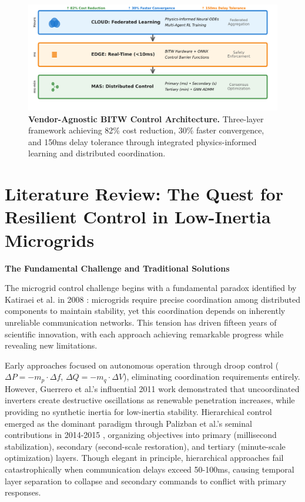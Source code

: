 \documentclass[12pt]{article}
\begin{document}
\begin{figure}[H]
\centering
\includegraphics[width=\textwidth]{figure3_system_architecture.pdf}
\vspace{-2cm}
\caption{\textbf{Vendor-Agnostic BITW Control Architecture.} Three-layer framework achieving 82\% cost reduction, 30\% faster convergence, and 150ms delay tolerance through integrated physics-informed learning and distributed coordination.}
\label{fig:architecture}
\end{figure}

\section{Literature Review: The Quest for Resilient Control in Low-Inertia Microgrids}

\textbf{The Fundamental Challenge and Traditional Solutions}

The microgrid control challenge begins with a fundamental paradox identified by Katiraei et al. in 2008 \cite{katiraei2008}: microgrids require precise coordination among distributed components to maintain stability, yet this coordination depends on inherently unreliable communication networks. This tension has driven fifteen years of scientific innovation, with each approach achieving remarkable progress while revealing new limitations.

Early approaches focused on autonomous operation through droop control ($\Delta P = -m_p \cdot \Delta f$, $\Delta Q = -m_q \cdot \Delta V$), eliminating coordination requirements entirely. However, Guerrero et al.'s influential 2011 work \cite{guerrero2011} demonstrated that uncoordinated inverters create destructive oscillations as renewable penetration increases, while providing no synthetic inertia for low-inertia stability. Hierarchical control emerged as the dominant paradigm through Palizban et al.'s seminal contributions in 2014-2015 \cite{palizban2014,palizban2015}, organizing objectives into primary (millisecond stabilization), secondary (second-scale restoration), and tertiary (minute-scale optimization) layers. Though elegant in principle, hierarchical approaches fail catastrophically when communication delays exceed 50-100ms, causing temporal layer separation to collapse and secondary commands to conflict with primary responses.
\end{document}
